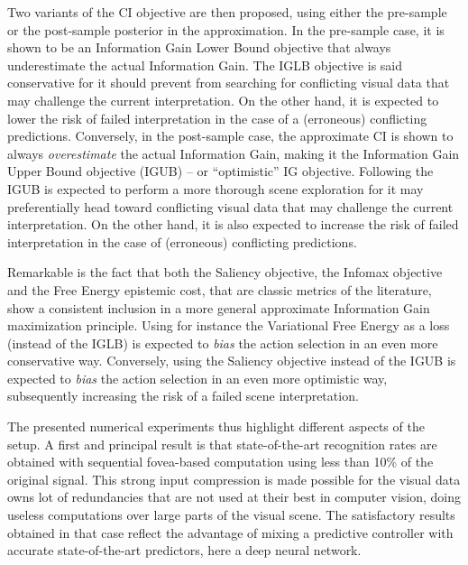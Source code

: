\documentclass[12pt,twoside,openright]{article}
\begin{document}
Two variants of the CI objective are then proposed, using either the pre-sample or the post-sample posterior in the approximation. In the pre-sample case, it is shown to be an Information Gain Lower Bound objective that always underestimate the actual Information Gain. The IGLB objective is {\color{Purple} said conservative for it should prevent from searching for conflicting visual data that may challenge the current interpretation}. On the other hand, it is expected to lower the risk of failed interpretation in the case of a (erroneous) conflicting predictions.
Conversely, in the post-sample case, the approximate CI is shown to always \emph{overestimate} the actual Information Gain, 
making it the Information Gain Upper Bound objective (IGUB) {\color{Purple} -- or ``optimistic'' IG objective}. Following the IGUB is expected to perform a more thorough scene exploration for it may preferentially head toward conflicting visual data that may challenge the current interpretation. On the other hand, it is also expected to increase the risk of failed interpretation in the case of (erroneous) conflicting predictions. 

Remarkable is the fact that both the Saliency objective, the Infomax  objective and the Free Energy epistemic cost, that are classic metrics of the literature,  show a consistent inclusion in a more general approximate Information Gain maximization principle.  Using for instance the Variational Free Energy \citep{friston2015active} as a loss (instead of the IGLB) is expected to \emph{bias} the action selection in an even more conservative way. Conversely, using the Saliency objective \citep{itti2005bayesian} instead of the IGUB is  expected to \emph{bias} the action selection in an even more optimistic way, subsequently increasing the risk of a failed scene interpretation.

The presented numerical experiments thus highlight different aspects of the setup. 
A first and principal result is that state-of-the-art recognition rates are obtained with sequential fovea-based computation using less than 10\% of the original signal. This strong input compression is made possible for the visual data owns lot of redundancies that are not used at their best in computer vision, doing useless computations over large parts of the visual scene. The satisfactory results obtained in that case reflect the advantage of mixing a predictive controller with accurate state-of-the-art predictors, here a deep neural network. 
\end{document}
